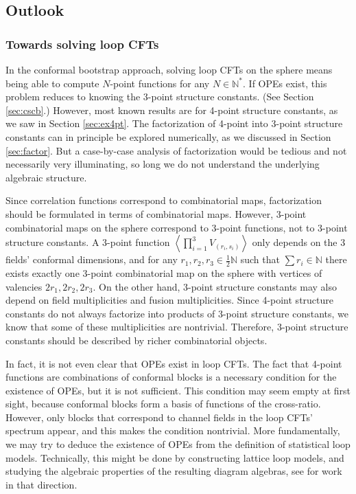 \documentclass[12pt, a4paper]{article}
\theoremstyle{break}
\begin{document}
\subsection{Outlook}

\subsubsection{Towards solving loop CFTs}

In the conformal bootstrap approach, solving loop CFTs on the sphere means being able to compute $N$-point functions for any $N\in \mathbb{N}^*$. If OPEs exist, this problem reduces to knowing the 3-point structure constants. (See Section \ref{sec:cscb}.) However, most known results are for 4-point structure constants, as we saw in Section \ref{sec:ex4pt}. The factorization of 4-point into 3-point structure constants can in principle be explored numerically, as we discussed in Section \ref{sec:factor}. But a case-by-case analysis of factorization would be tedious and not necessarily very illuminating, so long we do not understand the underlying algebraic structure. 

Since correlation functions correspond to combinatorial maps, factorization should be formulated in terms of combinatorial maps. However, 3-point combinatorial maps on the sphere correspond to 3-point functions, not to 3-point structure constants. A 3-point function $\left<\prod_{i=1}^3 V_{(r_i,s_i)}\right>$ only depends on the 3 fields' conformal dimensions, and for any $r_1,r_2,r_3\in \frac12\mathbb{N}$ such that $\sum r_i\in\mathbb{N}$ there exists exactly one 3-point combinatorial map on the sphere with vertices of valencies $2r_1,2r_2,2r_3$.
On the other hand, 3-point structure constants may also depend on field multiplicities and fusion multiplicities. Since 4-point structure constants do not always factorize into products of 3-point structure constants, we know that some of these multiplicities are nontrivial. Therefore, 3-point structure constants should be described by richer combinatorial objects. 

In fact, it is not even clear that OPEs exist in loop CFTs. The fact that 4-point functions are combinations of conformal blocks is a necessary condition for the existence of OPEs, but it is not sufficient. This condition may seem empty at first sight, because conformal blocks form a basis of functions of the cross-ratio. However, only blocks that correspond to channel fields in the loop CFTs' spectrum appear, and this makes the condition nontrivial. More fundamentally, we may try to deduce the existence of OPEs from the definition of statistical loop models. Technically, this might be done by constructing lattice loop models, and studying the algebraic properties of the resulting diagram algebras, see \cite{im23} for work in that direction.    
\end{document}
